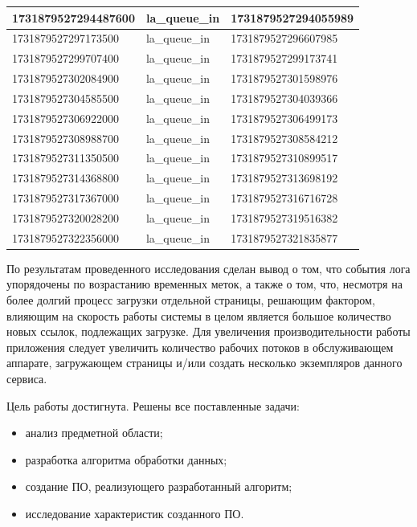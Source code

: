 \begin{longtable}{|p{}|p{}|p{}|}
    1731879527294487600 & la\_queue\_in & 1731879527294055989\\ \hline
    1731879527297173500 & la\_queue\_in & 1731879527296607985\\ \hline
    1731879527299707400 & la\_queue\_in & 1731879527299173741\\ \hline
    1731879527302084900 & la\_queue\_in & 1731879527301598976\\ \hline
    1731879527304585500 & la\_queue\_in & 1731879527304039366\\ \hline
    1731879527306922000 & la\_queue\_in & 1731879527306499173\\ \hline
    1731879527308988700 & la\_queue\_in & 1731879527308584212\\ \hline
    1731879527311350500 & la\_queue\_in & 1731879527310899517\\ \hline
    1731879527314368800 & la\_queue\_in & 1731879527313698192\\ \hline
    1731879527317367000 & la\_queue\_in & 1731879527316716728\\ \hline
    1731879527320028200 & la\_queue\_in & 1731879527319516382\\ \hline
    1731879527322356000 & la\_queue\_in & 1731879527321835877\\ \hline
\end{longtable}

По результатам проведенного исследования сделан вывод о том, что события лога упорядочены по возрастанию временных меток, а также о том, что, несмотря на более долгий процесс загрузки отдельной страницы, решающим фактором, влияющим на скорость работы системы в целом является большое количество новых ссылок, подлежащих загрузке. Для увеличения производительности работы приложения следует увеличить количество рабочих потоков в обслуживающем аппарате, загружающем страницы и/или создать несколько экземпляров данного сервиса.


Цель работы достигнута. Решены все поставленные задачи: 
\begin{itemize}
    \item анализ предметной области;
    \item разработка алгоритма обработки данных;
    \item создание ПО, реализующего разработанный алгоритм;
    \item исследование характеристик созданного ПО.
\end{itemize}
